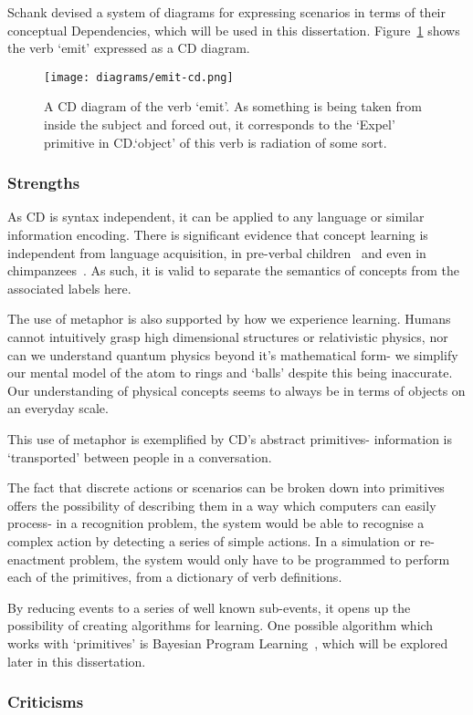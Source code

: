 \documentclass[dissertation.tex]{subfiles}
\begin{document}
    Schank devised a system of diagrams for expressing scenarios in terms of their conceptual Dependencies, which will be used in this dissertation. Figure~\ref{fig:emit-cd} shows the verb `emit' expressed as a CD diagram.
    \begin{figure}
        \centerline{
            \texttt{[image: diagrams/emit-cd.png]}
        }
        \caption{A CD diagram of the verb `emit'. As something is being taken from inside the subject and forced out, it corresponds to the `Expel' primitive in CD.\@The `object' of this verb is radiation of some sort.}\label{fig:emit-cd}
    \end{figure}

    \subsubsection{Strengths}
    As CD is syntax independent, it can be applied to any language or similar information encoding. There is significant evidence that concept learning is independent from language acquisition, in pre-verbal children~\cite{mandler-canovas2014imageschemas} and even in chimpanzees~\cite{Dahl-Adachi2013chimpanzees}. As such, it is valid to separate the semantics of concepts from the associated labels here.

    The use of metaphor is also supported by how we experience learning. Humans cannot intuitively grasp high dimensional structures or relativistic physics, nor can we understand quantum physics beyond it's mathematical form- we simplify our mental model of the atom to rings and `balls' despite this being inaccurate. Our understanding of physical concepts seems to always be in terms of objects on an everyday scale.

    This use of metaphor is exemplified by CD's abstract primitives- information is `transported' between people in a conversation.

    The fact that discrete actions or scenarios can be broken down into primitives offers the possibility of describing them in a way which computers can easily process- in a recognition problem, the system would be able to recognise a complex action by detecting a series of simple actions. In a simulation or re-enactment problem, the system would only have to be programmed to perform each of the primitives, from a dictionary of verb definitions.

    By reducing events to a series of well known sub-events, it opens up the possibility of creating algorithms for learning. One possible algorithm which works with `primitives' is Bayesian Program Learning~\cite{one-shot-learning}, which will be explored later in this dissertation. %

    \subsubsection{Criticisms}

    
    
\end{document}
